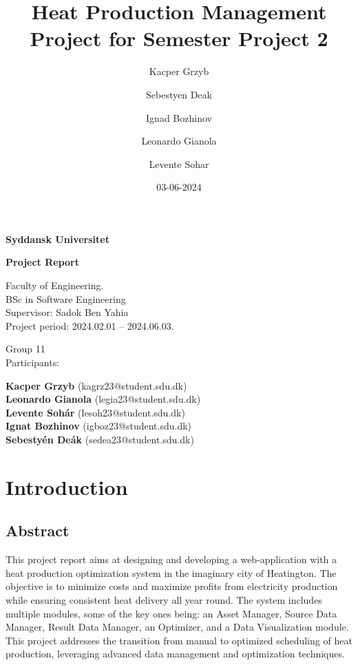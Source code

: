 \documentclass[12pt]{report}
\title{Heat Production Management Project for Semester Project 2}
\author{Kacper Grzyb \and Sebestyen Deak \and Ignad Bozhinov \and Leonardo Gianola \and Levente Sohar}
\date{03-06-2024}
\begin{document}
\begin{titlepage}
  \centering
  \vspace*{1cm}
  
  \Huge
  \textbf{Syddansk Universitet}
  
  \vspace{2cm}
  
  \Huge
  \textbf{Project Report}
  
  \vfill
  
  \large
  Faculty of Engineering.\\
  BSc in Software Engineering\\
  Supervisor: Sadok Ben Yahia\\
  Project period: 2024.02.01 -- 2024.06.03.
  
  \vfill
  \begin{flushleft}  
    Group 11\\
    Participants: \\
  \end{flushleft}

    \hfill \small{\textbf{Kacper Grzyb} (kagrz23@student.sdu.dk)} \\
    \hfill \small{\textbf{Leonardo Gianola} (legia23@student.sdu.dk)} \\
    \hfill \small{\textbf{Levente Sohár} (lesoh23@student.sdu.dk)} \\
    \hfill \small{\textbf{Ignat Bozhinov} (igboz23@student.sdu.dk)} \\
    \hfill \small{\textbf{Sebestyén Deák} (sedea23@student.sdu.dk)} \\

\end{titlepage}

\tableofcontents

\chapter{Introduction}

\section*{Abstract}
This project report aims at designing and developing a web-application with a heat production optimization system in the imaginary city of Heatington. The objective is to minimize costs and maximize profits from electricity production while ensuring consistent heat delivery all year round. The system includes multiple modules, some of the key ones being: an Asset Manager, Source Data Manager, Result Data Manager, an Optimizer, and a Data Visualization module. This project addresses the transition from manual to optimized scheduling of heat production, leveraging advanced data management and optimization techniques.
\end{document}
